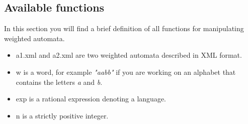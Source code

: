\subsection{Available functions}
In this section you will find a brief definition of all functions for
manipulating weighted automata.
\begin{itemize}
\item a1.xml and a2.xml are two weighted automata described in
  \Vauc XML format.
\item w is a word, for example \textit{"aabb"} if you are working on an
  alphabet that contains the letters \textit{a} and \textit{b}.
\item exp is a rational expression denoting a language.
\item n is a strictly positive integer.
\end{itemize}

